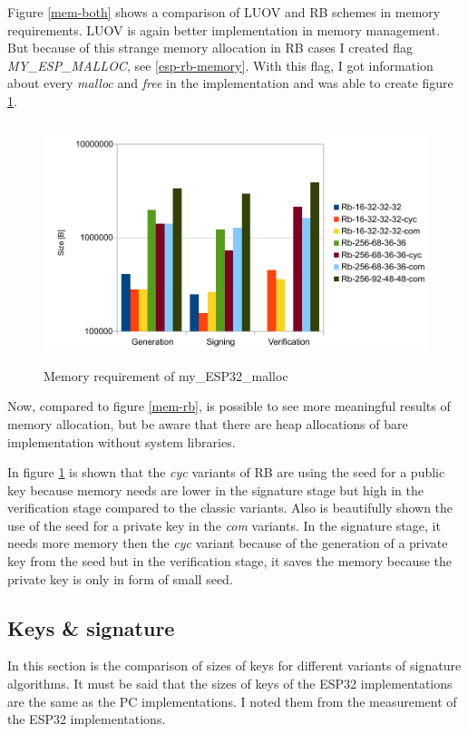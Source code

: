 \documentclass[thesis=M,english]{FITthesis}[2019/12/23]
\begin{document}
\noindent
Figure \ref{mem-both} shows a comparison of LUOV and RB schemes in memory requirements. LUOV is again better implementation in memory management. But because of this strange memory allocation in RB cases I created flag \textit{MY\_ESP\_MALLOC}, see \ref{esp-rb-memory}. With this flag, I got information about every \textit{malloc} and \textit{free} in the implementation and was able to create figure \ref{mem-my-alloc}.

\begin{figure}[H]
\centering
\includegraphics[width=13cm,height=7cm]{images/mem-my_esp_malloc.pdf}
\caption{Memory requirement of my\_ESP32\_malloc}
\label{mem-my-alloc}
\end{figure}

\noindent
Now, compared to figure \ref{mem-rb}, is possible to see more meaningful results of memory allocation, but be aware that there are heap allocations of bare implementation without system libraries.

\bigskip
\noindent
In figure \ref{mem-my-alloc} is shown that the \textit{cyc} variants of RB are using the seed for a public key because memory needs are lower in the signature stage but high in the verification stage compared to the classic variants. Also is beautifully shown the use of the seed for a private key in the \textit{com} variants. In the signature stage, it needs more memory then the \textit{cyc} variant because of the generation of a private key from the seed but in the verification stage, it saves the memory because the private key is only in form of small seed.

\subsection{Keys \& signature} \label{key_sign}
In this section is the comparison of sizes of keys for different variants of signature algorithms. It must be said that the sizes of keys of the ESP32 implementations are the same as the PC implementations. I noted them from the measurement of the ESP32 implementations.
\end{document}
